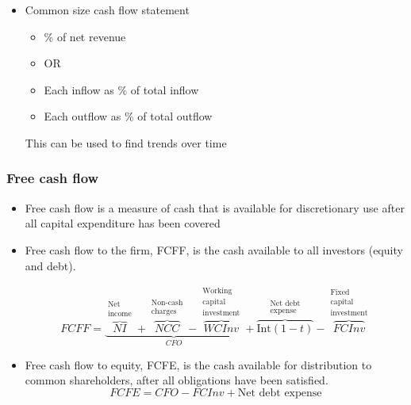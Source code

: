 \documentclass[../notes_compiled.tex]{subfiles}
\begin{document}
\begin{itemize}
\item Common size cash flow statement
\begin{itemize}
\item \% of net revenue
\item[] OR
\item Each inflow as \% of total inflow
\item Each outflow as \% of total outflow
\end{itemize}
This can be used to find trends over time
\end{itemize}


\subsubsection{Free cash flow}
\begin{itemize}
\item Free cash flow is a measure of cash that is available for discretionary use after all capital expenditure has been covered

\item Free cash flow to the firm, FCFF, is the cash available to all investors (equity and debt).

\begin{equation}
FCFF = \underbrace{\overbrace{NI}^{\substack{\text{Net} \\ \text{income}}} + \overbrace{NCC}^{\substack{\text{Non-cash} \\ \text{charges}}} - \overbrace{WCInv}^{\substack{\text{Working} \\ \text{capital} \\ \text{investment}}}}_{CFO} + \overbrace{\text{Int}(1-t)}^{\substack{\text{Net debt} \\ \text{expense}}} - \overbrace{FCInv}^{\substack{\text{Fixed} \\ \text{capital} \\ \text{investment}}}
\end{equation}


\item Free cash flow to equity, FCFE, is the cash available for distribution to common shareholders, after all obligations have been satisfied.
\begin{equation}
FCFE = CFO - FCInv + \text{Net debt expense}
\end{equation}
\end{itemize}
\end{document}
